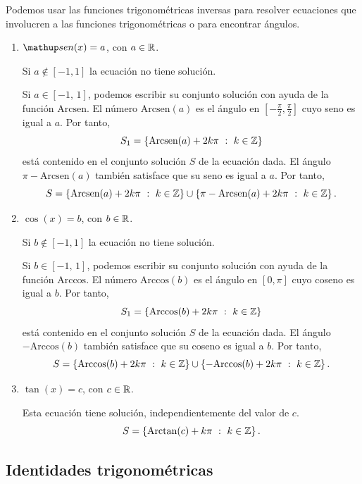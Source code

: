 \begin{ejemplo}
Podemos usar las funciones trigonométricas inversas para resolver ecuaciones que involucren a las funciones trigonométricas o para encontrar ángulos.
\begin{enumerate}
\item $\sen(x) = a$, con $a\in \mathbb{R}$.
		
	Si $a \not \in [-1,1]$ la ecuaci\'on no tiene soluci\'on.
		
	Si $a \in [-1,\,1]$, podemos escribir su conjunto soluci\'on con ayuda de la funci\'on $\mbox{Arcsen}$.
	El n\'umero $\mbox{Arcsen}(a)$ es el \'angulo en $\left[-\frac{\pi}{2},\frac{\pi}{2}\right]$ cuyo seno
	es igual a $a$. Por tanto,
	\[
		S_1 = \left\{\mbox{Arcsen}(a) + 2k\pi\ :\ k \in \mathbb{Z}\right\}
	\]
	est\'a contenido en el conjunto soluci\'on $S$ de la ecuaci\'on dada.
	El \'angulo $\pi-\mbox{Arcsen}(a)$ tambi\'en satisface que su seno es igual a $a$. Por tanto,
	\[
		S = \left\{\mbox{Arcsen}(a) + 2k\pi\ :\ k \in \Z\right\} \cup \left\{\pi-\mbox{Arcsen}(a) + 2k\pi\ :\ k \in \Z\right\}.
	\]			
		
\item $\cos(x) = b$, con $b \in \mathbb{R}$.
		
	Si $b \not \in [-1,1]$ la ecuaci\'on no tiene soluci\'on.
			
	Si $b \in [-1,\,1]$, podemos escribir su conjunto soluci\'on con ayuda de la funci\'on $\mbox{Arccos}$.
	El n\'umero $\mbox{Arccos}(b)$ es el \'angulo en $\left[0,\pi\right]$ cuyo coseno
	es igual a $b$. Por tanto,
	\[
		S_1 = \left\{\mbox{Arccos}(b) + 2k\pi\ :\ k \in \mathbb{Z}\right\}
	\]
	est\'a contenido en el conjunto soluci\'on $S$ de la ecuaci\'on dada.
	El \'angulo $-\mbox{Arccos}(b)$ tambi\'en satisface que su coseno es igual a $b$. Por tanto,
	\[
		S = \left\{\mbox{Arccos}(b) + 2k\pi\ :\ k \in \mathbb{Z}\right\} \cup \left\{-\mbox{Arccos}(b) + 2k\pi\ :\ k \in \mathbb{Z}\right\}.
	\]			
		
\item $\tan(x) = c$, con $c \in \mathbb{R}$.
		
	Esta ecuaci\'on tiene soluci\'on, independientemente del valor de $c$.
	\[
		S = \left\{\mbox{Arctan}(c) + k\pi\ :\ k \in \mathbb{Z}\right\}.
	\]			
\end{enumerate}
\end{ejemplo}


\subsection{Identidades trigonom\'etricas}

